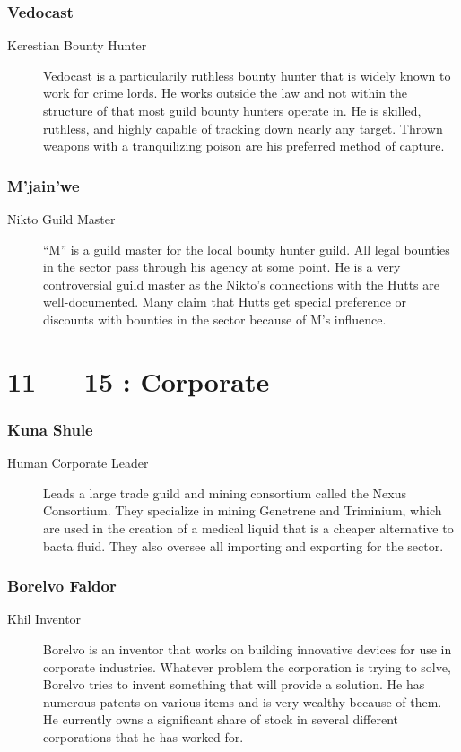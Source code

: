 \documentclass{article}
\begin{document}
\section{Vedocast}
\begin{description}
	\item [ Kerestian \male Bounty Hunter] Vedocast is a particularily ruthless bounty hunter that is widely known to work for crime lords. He works outside the law and not within the structure of that most guild bounty hunters operate in. He is skilled, ruthless, and highly capable of tracking down nearly any target. Thrown weapons with a tranquilizing poison are his preferred method of capture.
\end{description}
\section{M’jain’we}
\begin{description}
	\item [ Nikto \male Guild Master] “M” is a guild master for the local bounty hunter guild. All legal bounties in the sector pass through his agency at some point. He is a very controversial guild master as the Nikto’s connections with the Hutts are well-documented. Many claim that Hutts get special preference or discounts with bounties in the sector because of M’s influence.
\end{description}

\part*{11 --- 15 : Corporate}
\setcounter{section}{10}
\section{Kuna Shule}
\begin{description}
	\item [Human \male Corporate Leader] Leads a large trade guild and mining consortium called the Nexus Consortium. They specialize in mining Genetrene and Triminium, which are used in the creation of a medical liquid that is a cheaper alternative to bacta fluid. They also oversee all importing and exporting for the sector.
	\end{description}
\section{Borelvo Faldor}
\begin{description}
	\item [Khil \male Inventor] Borelvo is an inventor that works on building innovative devices for use in corporate industries. Whatever problem the corporation is trying to solve, Borelvo tries to invent something that will provide a solution. He has numerous patents on various items and is very wealthy because of them. He currently owns a significant share of stock in several different corporations that he has worked for.
	\end{description}
\end{document}
